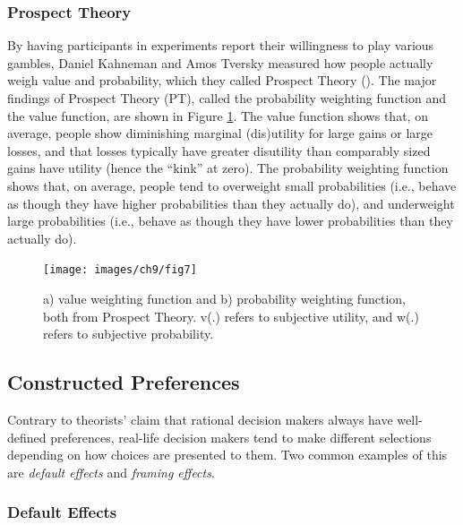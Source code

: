\documentclass[
]{krantz}
\begin{document}
\subsubsection*{Prospect Theory}\label{prospect-theory}


By having participants in experiments report their willingness to play various gambles, Daniel Kahneman and Amos Tversky measured how people actually weigh value and probability, which they called Prospect Theory (). The major findings of Prospect Theory (PT), called the probability weighting function and the value function, are shown in Figure \ref{fig:prospect}. The value function shows that, on average, people show diminishing marginal (dis)utility for large gains or large losses, and that losses typically have greater disutility than comparably sized gains have utility (hence the ``kink'' at zero). The probability weighting function shows that, on average, people tend to overweight small probabilities (i.e., behave as though they have higher probabilities than they actually do), and underweight large probabilities (i.e., behave as though they have lower probabilities than they actually do).

\begin{figure}

{\centering \texttt{[image: images/ch9/fig7]} 

}

\caption{a) value weighting function and b) probability weighting function, both from Prospect Theory. v(.) refers to subjective utility, and w(.) refers to subjective probability.}\label{fig:prospect}
\end{figure}

\subsection*{Constructed Preferences}\label{constructed-preferences}


Contrary to theorists' claim that rational decision makers always have well-defined preferences, real-life decision makers tend to make different selections depending on how choices are presented to them. Two common examples of this are \emph{default effects} and \emph{framing effects}.

\subsubsection*{Default Effects}\label{default-effects}
\end{document}
